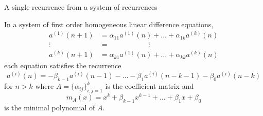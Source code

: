 \documentclass{beamer}%
\begin{document}
\begin{frame}{A single recurrence from a system of recurrences}
  \begin{theorem}
    In a system of first order homogeneous linear difference equations, \begin{align*}
      a^{(1)}(n+1) &= \alpha_{11}a^{(1)}(n) + \hdots + \alpha_{1k}a^{(k)}(n) \\
      \vdots\hspace{25pt} &= \hspace{66pt}\vdots  \\
      a^{(k)}(n+1) &= \alpha_{k1}a^{(1)}(n) + \hdots + \alpha_{kk}a^{(k)}(n)
    \end{align*} each equation satisfies the recurrence \[
      a^{(i)}(n) = -\beta_{k-1}a^{(i)}(n-1) - \hdots -\beta_{1}a^{(i)}(n-k-1) - \beta_0 a^{(i)}(n-k)
    \] for $n > k$ where $A = \{\alpha_{ij}\}_{i,j=1}^k$ is the coefficient matrix and \[
      m_A(x) = x^k + \beta_{k-1}x^{k-1} + \hdots + \beta_1 x + \beta_0
    \] is the minimal polynomial of $A$.
  \end{theorem}
\end{frame}
\end{document}
